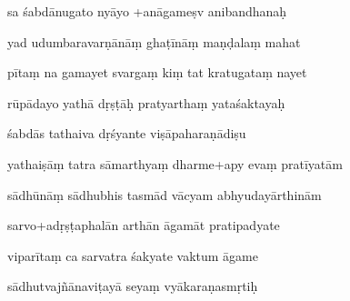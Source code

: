 \documentclass[article,12pt,a4paper]{memoir}%
\newcounter{parCount}
\begin{document}
	  
	  \pstart \leavevmode%
	sa śabdānugato nyāyo +anāgameṣv anibandhanaḥ 
	{}
	\pend%
      

	  
	  \pstart {} yad udumbaravarṇānāṃ ghaṭīnāṃ maṇḍalaṃ mahat 
	{}
	\pend%
      

	  
	  \pstart \leavevmode%
	pītaṃ na gamayet svargaṃ kiṃ tat kratugataṃ nayet 
	{}
	\pend%
      

	  
	  \pstart {} rūpādayo yathā dṛṣṭāḥ pratyarthaṃ yataśaktayaḥ 
	{}
	\pend%
      

	  
	  \pstart \leavevmode%
	śabdās tathaiva dṛśyante viṣāpaharaṇādiṣu 
	{}
	\pend%
      

	  
	  \pstart {} yathaiṣāṃ tatra sāmarthyaṃ dharme+apy evaṃ pratīyatām 
	{}
	\pend%
      

	  
	  \pstart \leavevmode%
	sādhūnāṃ sādhubhis tasmād vācyam abhyudayārthinām 
	{}
	\pend%
      

	  
	  \pstart {} sarvo+adṛṣṭaphalān arthān āgamāt pratipadyate 
	{}
	\pend%
      

	  
	  \pstart \leavevmode%
	viparītaṃ ca sarvatra śakyate vaktum āgame 
	{}
	\pend%
      

	  
	  \pstart {} sādhutvajñānaviṭayā seyaṃ vyākaraṇasmṛtiḥ 
	{}
	\pend%
      
\end{document}
